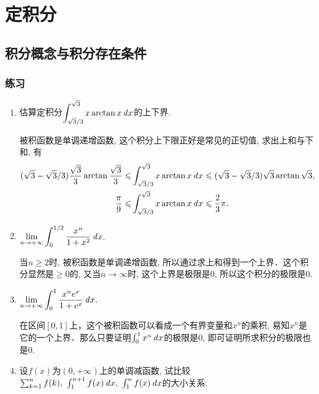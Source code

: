\chapter{定积分}

\section{积分概念与积分存在条件}

\ifshowex
{}
\subsection*{练习}

\begin{enumerate}
  \ifshowsol
    \setlength{\parskip}{9pt plus 3pt minus 2pt}
    \setlength{\itemsep}{7pt plus 2pt minus 2pt}
  \fi
\item 估算定积分\(\displaystyle \int_{\sqrt3/3}^{\sqrt3} x \arctan x \mathop{}\!\mathit{d} x\)的上下界.

  \ifshowsol
    被积函数是单调递增函数, 这个积分上下限正好是常见的正切值, 求出上和与下和, 有
    \[
      \begin{split}
        (\sqrt3 - \sqrt3/3)\frac{\sqrt3}{3} \arctan \frac{\sqrt3}{3}
        \le
        &\int_{\sqrt3/3}^{\sqrt3} x \arctan x \dx
          \le
          (\sqrt3 - \sqrt3/3) \sqrt3 \arctan\sqrt3, \\
        \frac{\pi}{9}
        \le
        &\int_{\sqrt3/3}^{\sqrt3} x \arctan x \dx
          \le
          \frac23 \pi.
      \end{split}
    \]
  \fi

\item \(\displaystyle \lim_{n\to+\infty} \int_0^{1/2} \frac{x^n}{1+x^2} \mathop{}\!\mathit{d} x\).

  \ifshowsol
    当\(n \ge 2\)时, 被积函数是单调递增函数, 所以通过求上和得到一个上界．这个积分显然是\(\ge 0\)的, 又当\(n\to\infty\)时, 这个上界是极限是\(0\), 所以这个积分的极限是\(0\).
  \fi

\item \(\displaystyle \lim_{n\to+\infty} \int_0^1 \frac{x^n e^x}{1+e^x} \mathop{}\!\mathit{d} x\).

  \ifshowsol
    在区间\([0, 1]\)上，这个被积函数可以看成一个有界变量和\(x^n\)的乘积, 易知\(x^n\)是它的一个上界．那么只要证明\(\int_0^1 x^n \mathop{}\!\mathit{d} x\)的极限是\(0\), 即可证明所求积分的极限也是\(0\).
  \fi

\item 设\(f(x)\)为\((0,+\infty)\)上的单调减函数, 试比较\(\sum_{k=1}^n f(k),\ \int_1^{n+1} f(x) \mathop{}\!\mathit{d} x,\ \int_1^{n} f(x) \mathop{}\!\mathit{d} x\)的大小关系.


\end{enumerate}
